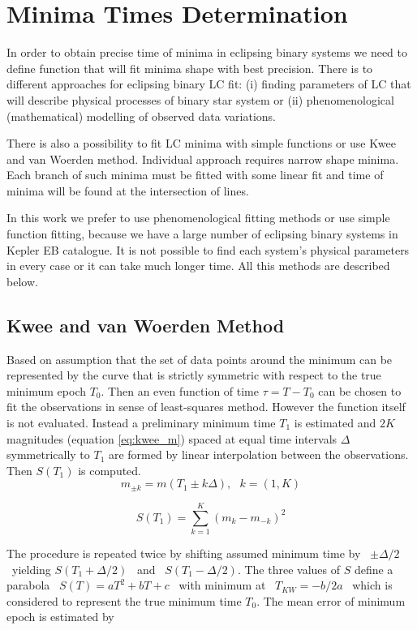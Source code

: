 \chapter{Minima Times Determination}
\label{Chapter_minima_det}
In order to obtain precise time of minima in eclipsing binary systems we need to define function that will fit minima shape with best precision.
There is to different approaches for eclipsing binary LC fit: (i) finding parameters of LC that will describe physical processes of binary star system or (ii) phenomenological (mathematical) modelling of observed data variations.

There is also a possibility to fit LC minima with simple functions or use Kwee and van Woerden method.
Individual approach requires narrow shape minima. Each branch of such minima must be fitted with some linear fit and time of minima will be found 
at the intersection of lines.

In this work we prefer to use phenomenological fitting methods or use simple function fitting, because we have a large number of eclipsing binary systems in Kepler EB catalogue. It is not possible to find each system's physical parameters in every case or it can take much longer time. All this methods are described below.


\section{Kwee and van Woerden Method}
Based on assumption that the set of data points around the minimum can be represented by the curve that is strictly 
symmetric with respect to the true minimum epoch $T_{0}$. Then an even function of time $\tau=T-T_{0}$ can be chosen to
fit the observations in sense of least-squares method. However the function itself is not evaluated. Instead a preliminary 
minimum time $T_{1}$ is estimated and $2K$ magnitudes (equation \ref{eq:kwee_m}) spaced at equal time intervals $\Delta$ symmetrically to $T_{1}$ are formed by linear interpolation between the observations.  Then $S(T_{1})$ is computed.
\begin{equation} \label{eq:kwee_m}
m_{\pm k} = m(T_{1}\pm k \Delta), ~~~ k=(1,K)
\end{equation}

\begin{equation} \label{eq:kwee_S}
S(T_{1}) = \sum_{k=1}^{K}(m_{k}-m_{-k})^2
\end{equation}

The procedure is repeated twice by shifting assumed minimum time by~ $\pm \Delta/2$ ~yielding $S(T_{1}+\Delta/2)$ ~and~ $S(T_{1}-\Delta/2)$.
The three values of $S$ define a parabola~ $S(T)=aT^2+bT+c$ ~with minimum at~ $T_{KW}=-b/2a$ ~which is considered to represent the 
true minimum time $T_{0}$. The mean error of minimum epoch is estimated by

